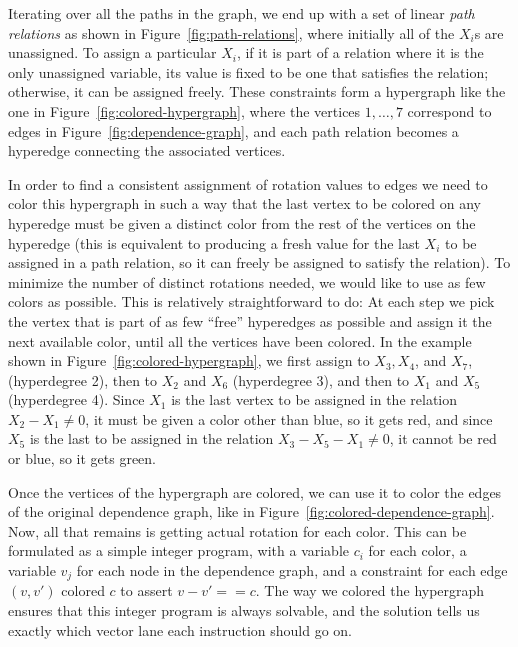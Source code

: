 
Iterating over all the paths in the graph, we end up with a set of linear {\em path relations} as shown in Figure~\ref{fig:path-relations}, where initially all of the $X_i$s are unassigned.
To assign a particular $X_i$, if it is part of a relation where it is the only unassigned variable, its value is fixed to be one that satisfies the relation; otherwise, it can be assigned freely.
These constraints form a hypergraph like the one in Figure~\ref{fig:colored-hypergraph}, where the vertices $1,\dots, 7$ correspond to edges in Figure~\ref{fig:dependence-graph}, and each path relation becomes a hyperedge connecting the associated vertices.

In order to find a consistent assignment of rotation values to edges we need to color this hypergraph in such a way that the last vertex to be colored on any hyperedge must be given a distinct color from the rest of the vertices on the hyperedge (this is equivalent to producing a fresh value for the last $X_i$ to be assigned in a path relation, so it can freely be assigned to satisfy the relation).
To minimize the number of distinct rotations needed, we would like to use as few colors as possible.
This is relatively straightforward to do: At each step we pick the vertex that is part of as few ``free'' hyperedges as possible and assign it the next available color, until all the vertices have been colored.
In the example shown in Figure~\ref{fig:colored-hypergraph}, we first assign to $X_3, X_4$, and $X_7$, (hyperdegree 2), then to $X_2$ and $X_6$ (hyperdegree 3), and then to $X_1$ and $X_5$ (hyperdegree 4).
Since $X_1$ is the last vertex to be assigned in the relation $X_2 - X_1 \neq 0$, it must be given a color other than blue, so it gets red, and since $X_5$ is the last to be assigned in the relation $X_3 - X_5 - X_1 \neq 0$, it cannot be red or blue, so it gets green.

Once the vertices of the hypergraph are colored, we can use it to color the edges of the original dependence graph, like in Figure~\ref{fig:colored-dependence-graph}. 
Now, all that remains is getting actual rotation for each color. 
This can be formulated as a simple integer program, with a variable $c_i$ for each color, a variable  $v_j$ for each node in the dependence graph, and a constraint for each edge $(v, v')$ colored $c$ to assert $v - v' == c$.
The way we colored the hypergraph ensures that this integer program is always solvable, and the solution tells us exactly which vector lane each instruction should go on.